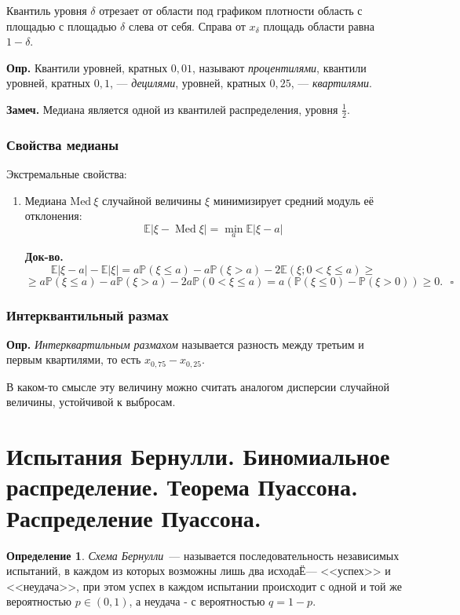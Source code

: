 \documentclass[oneside,final,14pt]{extreport}
\newcommand\mydef{{\bf Опр.}}
\newcommand\mynote{{\bf Замеч.}}
\newcommand\myqed{{\bf Док-во.}}
\newcommand\myprob[1]{{\mathbb{P}(#1)}}
\theoremstyle{definition}
\newtheorem{defn}{Определение}[section]
\begin{document}
Квантиль уровня $\delta$ отрезает от области под графиком плотности область с площадью с площадью $\delta$ слева от себя. Справа от $x_\delta$ площадь области равна $1 - \delta$.

\mydef{} Квантили уровней, кратных $0,01$, называют {\it процентилями}, квантили уровней, кратных $0,1$, — {\it децилями}, уровней, кратных $0,25$, — {\it квартилями}.

\mynote{} Медиана является одной из квантилей распределения, уровня $\frac{1}{2}.$

\subsubsection{Свойства медианы}

Экстремальные свойства:

\begin{enumerate}
    \item Медиана $\mathrm{Med}~\xi$ случайной величины $\xi$ минимизирует средний модуль её отклонения:
    $$\mathbb{E}|\xi-\operatorname{Med} \xi|=\min _{a} \mathbb{E}|\xi-a|$$
    
    \myqed{}
    $$\mathbb{E}|\xi - a| - \mathbb{E}|\xi| = a\myprob{\xi \leqslant a} - a\myprob{\xi > a} - 2\mathbb{E}(\xi; 0 < \xi \leqslant a) \geqslant$$ $$\geqslant a\myprob{\xi \leqslant a} - a\myprob{\xi > a} - 2a\myprob{0 < \xi \leqslant a} = a(\myprob{\xi \leqslant 0} - \myprob{\xi > 0}) \geqslant 0. ~~~\square $$
\end{enumerate}

\subsubsection{Интерквантильный размах}

\mydef{} {\it Интерквартильным размахом} называется разность между третьим и первым квартилями, то есть ${\displaystyle x_{0{,}75}-x_{0{,}25}}.$

В каком-то смысле эту величину можно считать аналогом дисперсии случайной величины, устойчивой к выбросам.

\section {Испытания Бернулли. Биномиальное распределение. Теорема Пуассона. Распределение Пуассона.}
\begin{defn}
    {\it Схема Бернулли}~--- называется последовательность независимых испытаний, в каждом из которых возможны лишь два исходаЁ--- <<успех>> и <<неудача>>, при этом успех в каждом испытании происходит с одной и той же вероятностью $p \in (0,1)$, а неудача - с вероятностью $q = 1 - p.$
\end{defn}
\end{document}
